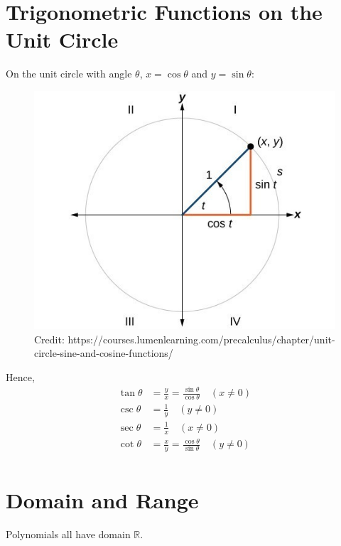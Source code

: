 \documentclass[12pt]{article}
\begin{document}
\section{Trigonometric Functions on the Unit Circle}

On the unit circle with angle \(\theta\), \(x=\cos\theta\) and \(y=\sin\theta\):\\

\begin{figure}[H]
	\centering
	\includegraphics[scale=0.5]{CNX_Precalc_Figure_05_02_0022.jpg}
	\caption{Credit: https://courses.lumenlearning.com/precalculus/chapter/unit-circle-sine-and-cosine-functions/}
\end{figure}

Hence, \\

\begin{align*}
\tan\theta &= \frac{y}{x} = \frac{\sin\theta}{\cos\theta} \quad (x \neq 0) \\
\csc\theta &= \frac{1}{y} \quad (y \neq 0) \\
\sec\theta &= \frac{1}{x} \quad (x \neq 0) \\
\cot\theta &= \frac{x}{y} =  \frac{\cos\theta}{\sin\theta} \quad (y \neq 0) \\
\end{align*}

\section{Domain and Range}

Polynomials all have domain \(\mathbb{R}\).\\
\end{document}
